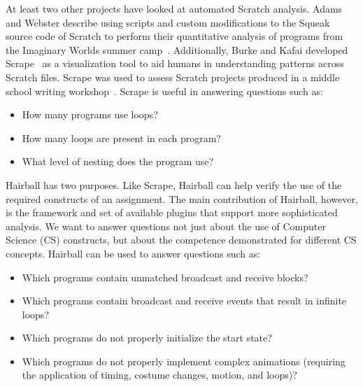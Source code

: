 At least two other projects have looked at automated Scratch analysis.  Adams
and Webster describe using scripts and custom modifications to the Squeak
source code of Scratch to perform their quantitative analysis of programs from
the Imaginary Worlds summer camp~\cite{Adams:2012:SLP:2157136.2157319}.
Additionally, Burke and Kafai developed Scrape~\cite{scrape-poster} as a
visualization tool to aid humans in understanding patterns across Scratch
files. Scrape was used to assess Scratch projects produced in a middle school
writing workshop~\cite{Burke:2012:WWY:2157136.2157264}. Scrape is useful in
answering questions such as:
\begin{itemize}
\vspace*{-.025in}
\item How many programs use loops?
\vspace*{-.025in}
\item How  many loops are present in each program?
\vspace*{-.025in}
\item What level of nesting does the program use?
\vspace*{-.025in}
\end{itemize}

Hairball has two purposes.  Like Scrape, Hairball can help verify the use of
the required constructs of an assignment.  The main contribution of Hairball,
however, is the framework and set of available plugins that support more
sophisticated analysis.  We want to answer questions not just about the use of
Computer Science (CS) constructs, but about the competence demonstrated for
different CS concepts. Hairball can be used to answer questions such as:
\begin{itemize}
\vspace*{-.025in}
\item Which programs contain unmatched broadcast and receive blocks?
\vspace*{-.025in}
\item Which programs contain broadcast and receive events that result in
  infinite loops?
\vspace*{-.025in}
\item Which programs do not properly initialize the start state?
\vspace*{-.025in}
\item Which programs do not properly implement complex animations (requiring
  the application of timing, costume changes, motion, and loops)?
\vspace*{-.025in}
\end{itemize}
\vspace*{0.25in}
